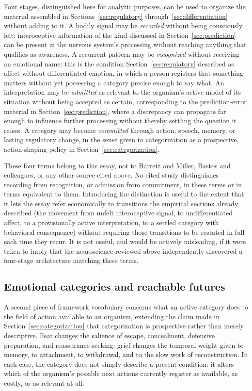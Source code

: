 \documentclass[11pt]{article}
\begin{document}
Four stages, distinguished here for analytic purposes, can be used to organize the material assembled in Sections~\ref{sec:regulatory} through~\ref{sec:differentiation} without adding to it. A bodily signal may be \emph{recorded} without being consciously felt: interoceptive information of the kind discussed in Section~\ref{sec:prediction} can be present in the nervous system's processing without reaching anything that qualifies as awareness. A recurrent pattern may be \emph{recognized} without receiving an emotional name: this is the condition Section~\ref{sec:regulatory} described as affect without differentiated emotion, in which a person registers that something matters without yet possessing a category precise enough to say what. An interpretation may be \emph{admitted} as relevant to the organism's active model of its situation without being accepted as certain, corresponding to the prediction-error material in Section~\ref{sec:prediction}, where a discrepancy can propagate far enough to influence further processing without thereby settling the question it raises. A category may become \emph{committed} through action, speech, memory, or lasting regulatory change, in the sense given to categorization as a prospective, action-shaping policy in Section~\ref{sec:categorization}.

These four terms belong to this essay, not to Barrett and Miller, Bastos and colleagues, or any other source cited above. No cited study distinguishes recording from recognition, or admission from commitment, in these terms or in terms equivalent to them. Introducing the distinction is useful to the extent that it lets the essay refer economically to transitions the empirical sections already described (the movement from unfelt interoceptive signal, to undifferentiated affect, to a provisionally active interpretation, to a settled category with behavioral consequence) without requiring those transitions to be restated in full each time they recur. It is not useful, and would be actively misleading, if it were taken to imply that the neuroscience reviewed above independently discovered a four-stage architecture matching these terms.

\subsection{Emotional categories and reachable futures}

A second piece of framework vocabulary concerns what an active category does to the field of action available to an organism, extending the claim made in Section~\ref{sec:categorization} that categorization is prospective rather than merely descriptive. Fear changes the salience of escape, concealment, defensive preparation, and reassurance-seeking; grief changes the temporal weight given to memory, to attachment, to withdrawal, and to the slow work of reconstruction. In each case, the category does not simply describe a present condition: it alters which of the organism's possible next actions currently register as available, as costly, or as relevant at all.
\end{document}
